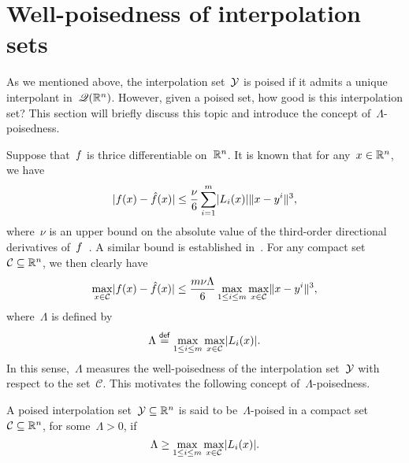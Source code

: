 \section{Well-poisedness of interpolation sets}
\label{sec:poisedness}

As we mentioned above, the interpolation set~$\xpt$ is poised if it admits a unique interpolant in~$\mathscr{Q}(\mathbb{R}^n)$.
However, given a poised set, how good is this interpolation set?
This section will briefly discuss this topic and introduce the concept of~$\Lambda$-poisedness.

Suppose that~$f$ is thrice differentiable on~$\mathbb{R}^n$.
It is known that for any~$x \in \mathbb{R}^n$, we have
\begin{equation}
    \label{eq:Ciarlet_Raviart_0}
    \abs{\obj(x) - \objm(x)} \le \frac{\nu}{6} \sum_{i = 1}^m \abs{\lagp[i](x)} \norm{x - y^i}^3,
\end{equation}
where~$\nu$ is an upper bound on the absolute value of the third-order directional derivatives of~$f$~\cite[thm.~2]{Powell_2001}.
A similar bound is established in~\cite[thm.~2]{Ciarlet_Raviart_1972}.
For any compact set~$\mathcal{C} \subseteq \mathbb{R}^n$, we then clearly have
\begin{equation}
    \label{eq:ciarlet-raviard-bound}
    \max_{x \in \mathcal{C}} \abs{\obj(x) - \objm(x)} \le \frac{m \nu \Lambda}{6} \max_{1 \le i \le m} \max_{x \in \mathcal{C}} \norm{x - y^i}^3,
\end{equation}
where~$\Lambda$ is defined by
\begin{equation}
    \label{eq:lambda-poisedness-convex-hull}
    \Lambda \eqdef \max_{1 \le i \le m} \max_{x \in \mathcal{C}} \abs{\lagp[i](x)}.
\end{equation}
In this sense,~$\Lambda$ measures the well-poisedness of the interpolation set~$\xpt$ with respect to the set~$\mathcal{C}$.
This motivates the following concept of~$\Lambda$-poisedness.

\begin{definition} %
    \label{def:lambda-poisedness}
    A poised interpolation set~$\xpt \subseteq \R^n$ is said to be~$\Lambda$-poised in a compact set~$\mathcal{C} \subseteq \mathbb{R}^n$, for some~$\Lambda > 0$, if
    \begin{equation*}
        \Lambda \ge \max_{1 \le i \le m} \max_{x \in \mathcal{C}} \abs{\lagp[i](x)}.
    \end{equation*}
\end{definition}

